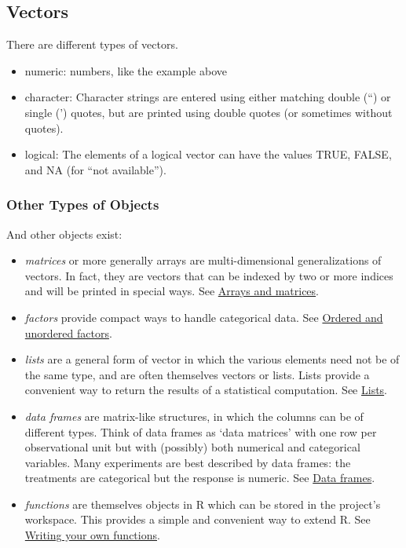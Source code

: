 \documentclass[
  letterpaper,
  DIV=11,
  numbers=noendperiod]{scrreprt}
\providecommand{\tightlist}{%
  \setlength{\itemsep}{0pt}\setlength{\parskip}{0pt}}\usepackage{longtable,booktabs,array}
\begin{document}
\hypertarget{vectors}{%
\subsection{Vectors}\label{vectors}}

There are different types of vectors.

\begin{itemize}
\tightlist
\item
  numeric: numbers, like the example above
\item
  character: Character strings are entered using either matching double
  (``) or single (') quotes, but are printed using double quotes (or
  sometimes without quotes).
\item
  logical: The elements of a logical vector can have the values TRUE,
  FALSE, and NA (for ``not available'').
\end{itemize}

\hypertarget{other-types-of-objects}{%
\subsubsection{Other Types of Objects}\label{other-types-of-objects}}

And other objects exist:

\begin{itemize}
\tightlist
\item
  \emph{matrices} or more generally arrays are multi-dimensional
  generalizations of vectors. In fact, they are vectors that can be
  indexed by two or more indices and will be printed in special ways.
  See
  \href{https://cloud.r-project.org/doc/manuals/r-release/R-intro.html\#Arrays-and-matrices}{Arrays
  and matrices}.
\item
  \emph{factors} provide compact ways to handle categorical data. See
  \href{https://cloud.r-project.org/doc/manuals/r-release/R-intro.html\#Factors}{Ordered
  and unordered factors}.
\item
  \emph{lists} are a general form of vector in which the various
  elements need not be of the same type, and are often themselves
  vectors or lists. Lists provide a convenient way to return the results
  of a statistical computation. See
  \href{https://cloud.r-project.org/doc/manuals/r-release/R-intro.html\#Lists}{Lists}.
\item
  \emph{data frames} are matrix-like structures, in which the columns
  can be of different types. Think of data frames as `data matrices'
  with one row per observational unit but with (possibly) both numerical
  and categorical variables. Many experiments are best described by data
  frames: the treatments are categorical but the response is numeric.
  See
  \href{https://cloud.r-project.org/doc/manuals/r-release/R-intro.html\#Data-frames}{Data
  frames}.
\item
  \emph{functions} are themselves objects in R which can be stored in
  the project's workspace. This provides a simple and convenient way to
  extend R. See
  \href{https://cloud.r-project.org/doc/manuals/r-release/R-intro.html\#Writing-your-own-functions}{Writing
  your own functions}.
\end{itemize}
\end{document}
